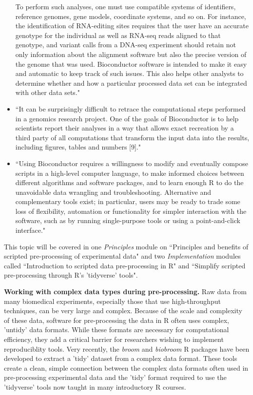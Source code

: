 \documentclass[pdftex,english,11pt,parskip=half]{scrartcl}
\begin{document}
\begin{itemize}
To perform such analyses, one must use compatible systems of identifiers, reference genomes, gene models, coordinate systems, and so on. For instance, the identification of RNA-editing sites requires that the user have an accurate genotype for the individual as well as RNA-seq reads aligned to that genotype, and variant calls from a DNA-seq experiment should retain not only information about the alignment software but also the precise version of the genome that was used. Bioconductor software is intended to make it easy and automatic to keep track of such issues. This also helps other analysts to determine whether and how a particular processed data set can be integrated with other data sets." \cite{huber2015orchestrating}
\item ``It can be surprisingly difficult to retrace the computational steps performed in a genomics research project. One of the goals of Bioconductor is to help scientists report their analyses in a way that allows exact recreation by a third party of all computations that transform the input data into the results, including figures, tables and numbers [9]." \cite{huber2015orchestrating}
\item ``Using Bioconductor requires a willingness to modify and eventually compose scripts in a high-level computer language, to make informed choices between different algorithms and software packages, and to learn enough R to do the unavoidable data wrangling and troubleshooting. Alternative and complementary tools exist; in particular, users may be ready to trade some loss of flexibility, automation or functionality for simpler interaction with the software, such as by running single-purpose tools or using a point-and-click interface." \cite{huber2015orchestrating}
\end{itemize}

This topic will be covered in one
\textit{Principles} module on ``Principles and benefits of scripted
pre-processing of experimental data" and two \textit{Implementation} modules
called ``Introduction to scripted data pre-processing in R" and ``Simplify
scripted pre-processing through R's 'tidyverse' tools".

\textbf{Working with complex data types during pre-processing.} Raw data from many biomedical experiments, especially those that
use high-throughput techniques, can be very large and complex. Because of the 
scale and complexity of these data, software for pre-processing the data in R
often uses complex, 'untidy' data formats. While these formats are necessary
for computational efficiency, they add a critical barrier for researchers wishing
to implement reproduciblity tools. Very recently, the \textit{broom} and \textit{biobroom} R packages have been developed 
to extract a 'tidy' dataset from a complex data format.
These tools create a clean, simple connection between the complex data formats
often used in pre-processing experimental data and the 'tidy' format
required to use the 'tidyverse' tools now taught in many introductory R courses.
\end{document}

